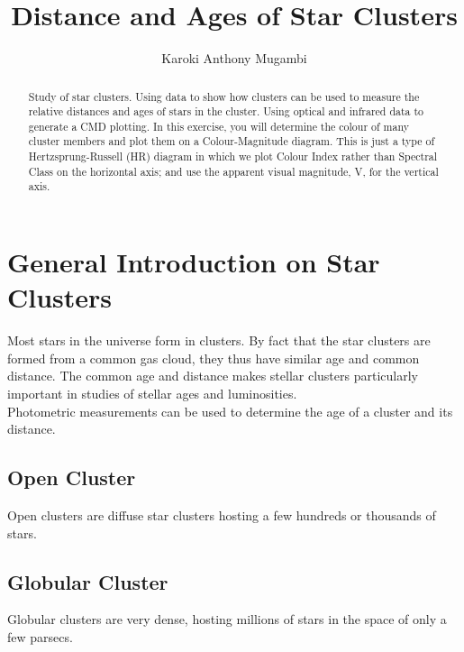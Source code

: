 \documentclass[12pt, twocolumn]{aastex62}
\title{Distance and Ages of Star Clusters}
\author{Karoki Anthony Mugambi}
\date{}
\begin{document}
	
	
	\onecolumn
	\maketitle
	\begin{abstract}
		Study of star clusters. Using data to show how clusters can be used to measure the relative distances and ages of stars in the cluster. Using optical and infrared data to generate a CMD plotting. In this exercise, you will determine the colour of many cluster members and plot them on a Colour-Magnitude diagram. This is just a type of Hertzsprung-Russell (HR) diagram in which we plot Colour Index rather than Spectral Class on the horizontal axis; and use the apparent visual magnitude, V, for the vertical axis.
	\end{abstract}
	
	\tableofcontents
	
	
	
	\pagebreak
	\section{General Introduction on Star Clusters}
	\label{introduction}
	Most stars in the universe form in clusters. By fact that the star clusters are formed from a common gas cloud, they thus have similar age and common distance. The common age and distance makes stellar clusters particularly important in studies of stellar ages and luminosities.\\
	Photometric measurements can be used to determine the age of a cluster and its distance.
	
		\subsection{Open Cluster}
		Open clusters are diffuse star clusters hosting a few hundreds or thousands of stars.
		
		 
		\subsection{Globular Cluster}
		Globular clusters are very dense, hosting millions of stars in the space of only a few parsecs.
	
\end{document}
